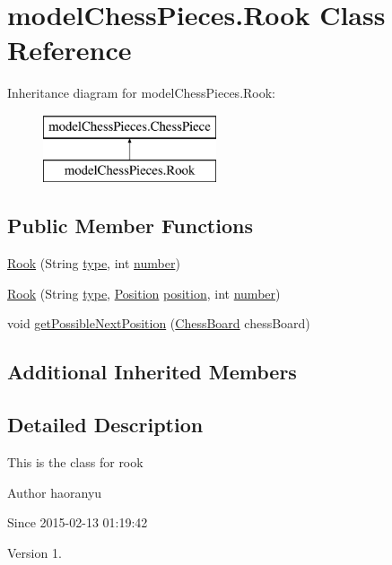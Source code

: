 \hypertarget{classmodel_chess_pieces_1_1_rook}{\section{model\+Chess\+Pieces.\+Rook Class Reference}
\label{classmodel_chess_pieces_1_1_rook}
}
Inheritance diagram for model\+Chess\+Pieces.\+Rook\+:\begin{figure}[H]
\begin{center}
\leavevmode
\includegraphics[height=2.000000cm]{classmodel_chess_pieces_1_1_rook}
\end{center}
\end{figure}
\subsection*{Public Member Functions}
\begin{DoxyCompactItemize}
\item 
\hyperlink{classmodel_chess_pieces_1_1_rook_a7cef743a515cb9ea132e09c99060cc96}{Rook} (String \hyperlink{classmodel_chess_pieces_1_1_chess_piece_a195487ca88c197af7c1604247be31db2}{type}, int \hyperlink{classmodel_chess_pieces_1_1_chess_piece_a979e63b99128333883acedc38d25dc87}{number})
\item 
\hyperlink{classmodel_chess_pieces_1_1_rook_af2c466d81052c7adcbb443d235aecdb6}{Rook} (String \hyperlink{classmodel_chess_pieces_1_1_chess_piece_a195487ca88c197af7c1604247be31db2}{type}, \hyperlink{classmodel_core_1_1_position}{Position} \hyperlink{classmodel_chess_pieces_1_1_chess_piece_a3d4362d5b28f6edb14161196d9c6807d}{position}, int \hyperlink{classmodel_chess_pieces_1_1_chess_piece_a979e63b99128333883acedc38d25dc87}{number})
\item 
void \hyperlink{classmodel_chess_pieces_1_1_rook_a7e434d240d3d0e04e44a5f816edbdbd8}{get\+Possible\+Next\+Position} (\hyperlink{classmodel_core_1_1_chess_board}{Chess\+Board} chess\+Board)
\end{DoxyCompactItemize}
\subsection*{Additional Inherited Members}


\subsection{Detailed Description}
This is the class for rook \begin{DoxyAuthor}{Author}
haoranyu 
\end{DoxyAuthor}
\begin{DoxySince}{Since}
2015-\/02-\/13 01\+:19\+:42 
\end{DoxySince}
\begin{DoxyVersion}{Version}
1. 
\end{DoxyVersion}


